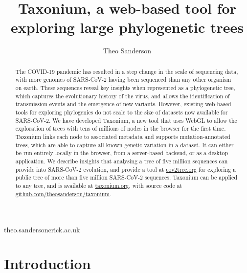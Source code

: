 \documentclass[twocolumn]{bioRxiv}
\begin{document}

\title{Taxonium, a web-based tool for exploring large phylogenetic trees}

\author[1]{Theo Sanderson }

\date{}

\maketitle

\begin{abstract}
The COVID-19 pandemic has resulted in a step change in the scale of sequencing data, with more genomes of SARS-CoV-2 having been sequenced than any other organism on earth. These sequences reveal key insights when represented as a phylogenetic tree, which captures the evolutionary history of the virus, and allows the identification of transmission events and the emergence of new variants. However, existing web-based tools for exploring phylogenies do not scale to the size of datasets now available for SARS-CoV-2. We have developed Taxonium, a new tool that uses WebGL to allow the exploration of trees with tens of millions of nodes in the browser for the first time. Taxonium links each node to associated metadata and supports mutation-annotated trees, which are able to capture all known genetic variation in a dataset. It can either be run entirely locally in the browser, from a server-based backend, or as a desktop application.  We describe insights that analysing a tree of five million sequences can provide into SARS-CoV-2 evolution, and provide a tool at \href{http://cov2tree.org}{cov2tree.org} for exploring a public tree of more than five million SARS-CoV-2 sequences. Taxonium can be applied to any tree, and is available at \href{http://taxonium.org}{taxonium.org}, with source code at \href{https://github.com/theosanderson/taxonium}{github.com/theosanderson/taxonium}.


\end{abstract}


\begin{corrauthor}
theo.sanderson\at crick.ac.uk
\end{corrauthor}

\section*{Introduction}\label{s:introduction}
\end{document}
